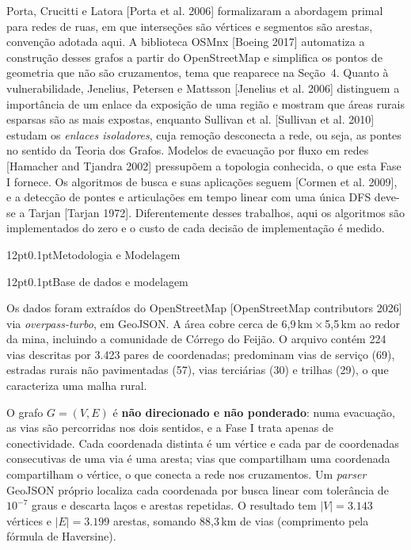 \documentclass[12pt,a4paper]{article}
\makeatletter
\renewcommand\section{\@startsection{section}{1}{\z@}%
  {12pt}{0.1pt}{\normalfont\fontsize{13}{15}\selectfont\bfseries}}
\renewcommand\subsection{\@startsection{subsection}{2}{\z@}%
  {12pt}{0.1pt}{\normalfont\normalsize\bfseries}}
\makeatother
\begin{document}
Porta, Crucitti e Latora [Porta et al. 2006] formalizaram a abordagem primal para redes de ruas, em que interseções são vértices e segmentos são arestas, convenção adotada aqui. A biblioteca OSMnx [Boeing 2017] automatiza a construção desses grafos a partir do OpenStreetMap e simplifica os pontos de geometria que não são cruzamentos, tema que reaparece na Seção~4. Quanto à vulnerabilidade, Jenelius, Petersen e Mattsson [Jenelius et al. 2006] distinguem a importância de um enlace da exposição de uma região e mostram que áreas rurais esparsas são as mais expostas, enquanto Sullivan et al. [Sullivan et al. 2010] estudam os \emph{enlaces isoladores}, cuja remoção desconecta a rede, ou seja, as pontes no sentido da Teoria dos Grafos. Modelos de evacuação por fluxo em redes [Hamacher and Tjandra 2002] pressupõem a topologia conhecida, o que esta Fase I fornece. Os algoritmos de busca e suas aplicações seguem [Cormen et al. 2009], e a detecção de pontes e articulações em tempo linear com uma única DFS deve-se a Tarjan [Tarjan 1972]. Diferentemente desses trabalhos, aqui os algoritmos são implementados do zero e o custo de cada decisão de implementação é medido.

\section{Metodologia e Modelagem}

\subsection{Base de dados e modelagem}

Os dados foram extraídos do OpenStreetMap [OpenStreetMap contributors 2026] via \emph{overpass-turbo}, em GeoJSON. A área cobre cerca de 6,9\,km\,$\times$\,5,5\,km ao redor da mina, incluindo a comunidade de Córrego do Feijão. O arquivo contém 224 vias descritas por 3.423 pares de coordenadas; predominam vias de serviço (69), estradas rurais não pavimentadas (57), vias terciárias (30) e trilhas (29), o que caracteriza uma malha rural.

O grafo $G=(V,E)$ é \textbf{não direcionado e não ponderado}: numa evacuação, as vias são percorridas nos dois sentidos, e a Fase I trata apenas de conectividade. Cada coordenada distinta é um vértice e cada par de coordenadas consecutivas de uma via é uma aresta; vias que compartilham uma coordenada compartilham o vértice, o que conecta a rede nos cruzamentos. Um \emph{parser} GeoJSON próprio localiza cada coordenada por busca linear com tolerância de $10^{-7}$ graus e descarta laços e arestas repetidas. O resultado tem $|V| = 3.143$ vértices e $|E| = 3.199$ arestas, somando 88,3\,km de vias (comprimento pela fórmula de Haversine).
\end{document}
